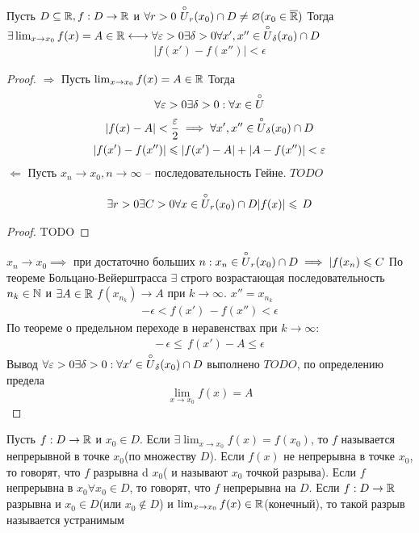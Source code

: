 \begin{theorem}
	Пусть $ D \subseteq \mathbb{R}, f:D\to \mathbb{R} $ и $ \forall r > 0\ \overset{\circ}{U}_r(x_0) \cap D \neq  \varnothing(x_0 \in \overline{ \mathbb{R}}) $
	Тогда $ \exists \lim_{x\to x_0}f(x) = A \in \mathbb{R} \longleftrightarrow \forall  \varepsilon > 0 \exists \delta > 0 \forall x', x'' \in \overset{\circ}{U}_\delta(x_0)\cap D $
	 \begin{gather}
		|f(x') - f(x'')| < \epsilon
	\end{gather}
\end{theorem}
\begin{proof}
	 $ \Longrightarrow $
	Пусть $ \lim_{x \to  x_0}f(x) = A \in  \mathbb{R} $ Тогда \begin{gather}
		\forall \varepsilon > 0 \exists \delta > 0: \forall x \in \overset{\circ}{U} \\
		|f(x) - A| < \dfrac{\varepsilon}{2} \implies \forall x', x'' \in \overset{\circ}{U}_\delta (x_0)\cap D \\
		|f(x') - f(x'')| \leqslant |f(x') - A| + |A - f(x'')| < \varepsilon
	\end{gather}
	 $ \Longleftarrow $ Пусть $ x_n \to x_0, n \to \infty $ -- последовательность Гейне.
	 $ TODO $ \begin{lemma}
	 \begin{gather}
		\exists r > 0 \exists C > 0 \forall x \in \overset{\circ}{U}_r(x_0)\cap D |f(x)| \leqslant\, D
	\end{gather}
\end{lemma}
	\begin{proof}
		TODO
	\end{proof}
	 $ x_n \to  x_0 \implies$ при достаточно больших $ n: x_n \in \overset{\circ}{U}_r(x_0) \cap D \implies  |f(x_n) \leqslant  C$
	 По теореме Больцано-Вейерштрасса $ \exists  $ строго возрастающая последовательность $ n_k \in \mathbb{N} $ и $ \exists  A \in \mathbb{R} $ $ f(x_{n_k}) \to A $ при $ k \to \infty $.
	 $ x'' = x_{n_k} $
	 \begin{gather}
		 - \epsilon < f(x')\, - f(x'') < \epsilon
	\end{gather}
	По теореме о предельном переходе в неравенствах при $ k \to  \infty $: \begin{gather}
		 -\, \epsilon \leq\, f(x') - A \leq \epsilon
	\end{gather}
	Вывод $ \forall \varepsilon > 0 \exists \delta > 0: \forall x' \in \overset{\circ}{U}_\delta(x_0) \cap D $ выполнено $ TODO  $, по определению предела \[ \lim_{x \to  x_0}f(x) = A \] 
\end{proof}
\begin{definition}
	Пусть $ f: D \to \mathbb{R} $ и $ x_0 \in D $. Если $ \exists \lim_{x \to x_0} f(x) = f(x_0)$, то $ f $ называется непрерывной в точке $ x_0 $(по множеству $ D $). Если $ f(x) $ не непрерывна в точке $ x_0 $,  то говорят, что $ f $ разрывна d $ x_0 $( и называют $ x_0 $ точкой разрыва).
	Если $ f $ непрерывна в $ x_0 \forall  x_0 \in  D $, то говорят, что $ f $ непрерывна на $ D $.
	Если $ f: D \to \mathbb{R} $ разрывна и $ x_0 \in D$(или $ x_0 \notin D $) и $ \lim_{x \to x_0}f(x) \in \mathbb{R} $(конечный), то такой разрыв называется устранимым
\end{definition}
